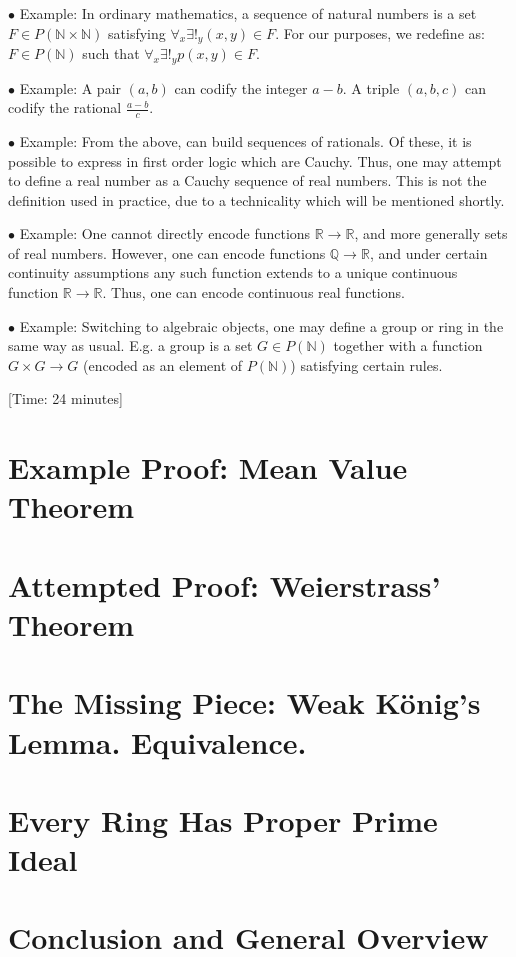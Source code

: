 \documentclass{article}
\theoremstyle{nonumberplain}
\newcommand{\N}{\mathbb{N}}
\newcommand{\Q}{\mathbb{Q}}
\newcommand{\R}{\mathbb{R}}
\newcommand\point[1]{\noindent \hspace{\labelsep} $\bullet$ #1 \smallskip}
\newcommand\timestamp[1]{\noindent \hspace{\labelsep} [Time: #1] \smallskip}
\begin{document}
\point{Example: In ordinary mathematics, a sequence of natural numbers is a set $F \in P(\N \times \N)$ satisfying $\forall_x \exists!_y (x,y) \in F$. For our purposes, we redefine as: $F \in P(\N)$ such that $\forall_x \exists!_y p(x,y) \in F$.}

\point{Example: A pair $(a,b)$ can codify the integer $a-b$. A triple $(a,b,c)$ can codify the rational $\frac{a-b}c$.}

\point{Example: From the above, can build sequences of rationals. Of these, it is possible to express in first order logic which are Cauchy. Thus, one may attempt to define a real number as a Cauchy sequence of real numbers. This is not the definition used in practice, due to a technicality which will be mentioned shortly.}

\point{Example: One cannot directly encode functions $\R \to \R$, and more generally sets of real numbers. However, one can encode functions $\Q \to \R$, and under certain continuity assumptions any such function extends to a unique continuous function $\R \to \R$. Thus, one can encode continuous real functions.}

\point{Example: Switching to algebraic objects, one may define a group or ring in the same way as usual. E.g. a group is a set $G \in P(\N)$ together with a function $G \times G \to G$ (encoded as an element of $P(\N)$) satisfying certain rules.}

\timestamp{24 minutes}

\section{Example Proof: Mean Value Theorem}

\section{Attempted Proof: Weierstrass' Theorem}

\section{The Missing Piece: Weak König's Lemma. Equivalence.}

\section{Every Ring Has Proper Prime Ideal}

\section{Conclusion and General Overview}
\end{document}
